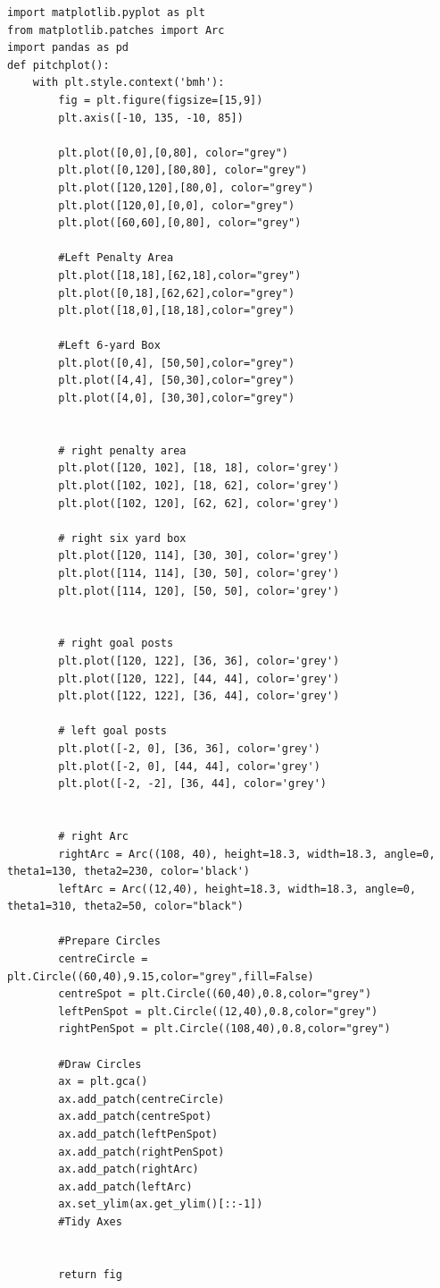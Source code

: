 \begin{lstlisting}[style=Python]
import matplotlib.pyplot as plt
from matplotlib.patches import Arc
import pandas as pd
def pitchplot():
    with plt.style.context('bmh'):
        fig = plt.figure(figsize=[15,9])
        plt.axis([-10, 135, -10, 85])
        
        plt.plot([0,0],[0,80], color="grey")
        plt.plot([0,120],[80,80], color="grey")
        plt.plot([120,120],[80,0], color="grey")
        plt.plot([120,0],[0,0], color="grey")
        plt.plot([60,60],[0,80], color="grey")

        #Left Penalty Area
        plt.plot([18,18],[62,18],color="grey")
        plt.plot([0,18],[62,62],color="grey")
        plt.plot([18,0],[18,18],color="grey")

        #Left 6-yard Box
        plt.plot([0,4], [50,50],color="grey")
        plt.plot([4,4], [50,30],color="grey")
        plt.plot([4,0], [30,30],color="grey")

        
        # right penalty area
        plt.plot([120, 102], [18, 18], color='grey')
        plt.plot([102, 102], [18, 62], color='grey')
        plt.plot([102, 120], [62, 62], color='grey')

        # right six yard box
        plt.plot([120, 114], [30, 30], color='grey')
        plt.plot([114, 114], [30, 50], color='grey')
        plt.plot([114, 120], [50, 50], color='grey')


        # right goal posts
        plt.plot([120, 122], [36, 36], color='grey')
        plt.plot([120, 122], [44, 44], color='grey')
        plt.plot([122, 122], [36, 44], color='grey')

        # left goal posts
        plt.plot([-2, 0], [36, 36], color='grey')
        plt.plot([-2, 0], [44, 44], color='grey')
        plt.plot([-2, -2], [36, 44], color='grey')
        
        
        # right Arc
        rightArc = Arc((108, 40), height=18.3, width=18.3, angle=0, theta1=130, theta2=230, color='black')
        leftArc = Arc((12,40), height=18.3, width=18.3, angle=0, theta1=310, theta2=50, color="black")
        
        #Prepare Circles
        centreCircle = plt.Circle((60,40),9.15,color="grey",fill=False)
        centreSpot = plt.Circle((60,40),0.8,color="grey")
        leftPenSpot = plt.Circle((12,40),0.8,color="grey")
        rightPenSpot = plt.Circle((108,40),0.8,color="grey")

        #Draw Circles
        ax = plt.gca()
        ax.add_patch(centreCircle)
        ax.add_patch(centreSpot)
        ax.add_patch(leftPenSpot)
        ax.add_patch(rightPenSpot)      
        ax.add_patch(rightArc)
        ax.add_patch(leftArc)
        ax.set_ylim(ax.get_ylim()[::-1])
        #Tidy Axes

    
        return fig
\end{lstlisting}


